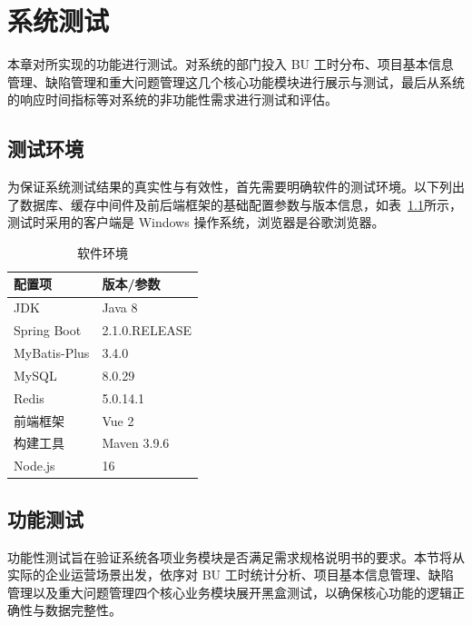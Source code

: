 \chapter{系统测试}
本章对所实现的功能进行测试。对系统的部门投入 BU 工时分布、项目基本信息管理、缺陷管理和重大问题管理这几个核心功能模块进行展示与测试，最后从系统的响应时间指标等对系统的非功能性需求进行测试和评估。
\section{测试环境}
为保证系统测试结果的真实性与有效性，首先需要明确软件的测试环境。以下列出了数据库、缓存中间件及前后端框架的基础配置参数与版本信息，如表~\ref{tab:software-env}所示，测试时采用的客户端是 Windows 操作系统，浏览器是谷歌浏览器。
\begin{table}[H]
	\centering
	\caption{软件环境}
	\label{tab:software-env}
	{\songti\seuwuhao\selectfont
		\begin{tabular}{ll}
			\toprule
			配置项 & 版本/参数 \\
			\midrule
			JDK & Java 8 \\
			Spring Boot & 2.1.0.RELEASE \\
			MyBatis-Plus & 3.4.0 \\
			MySQL & 8.0.29 \\
			Redis & 5.0.14.1 \\
			前端框架 & Vue 2 \\
			构建工具 & Maven 3.9.6\\
			Node.js & 16 \\
			\bottomrule
		\end{tabular}
	}
\end{table}


\FloatBarrier
\section{功能测试}
功能性测试旨在验证系统各项业务模块是否满足需求规格说明书的要求。本节将从实际的企业运营场景出发，依序对 BU 工时统计分析、项目基本信息管理、缺陷管理以及重大问题管理四个核心业务模块展开黑盒测试，以确保核心功能的逻辑正确性与数据完整性。
